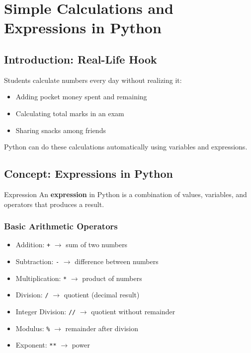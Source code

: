 \chapter{Simple Calculations and Expressions in Python}

\section{Introduction: Real-Life Hook}

Students calculate numbers every day without realizing it:  

\begin{itemize}
    \item Adding pocket money spent and remaining  
    \item Calculating total marks in an exam  
    \item Sharing snacks among friends  
\end{itemize}

Python can do these calculations automatically using variables and expressions.

\section{Concept: Expressions in Python}

\begin{definition}{Expression}
An \textbf{expression} in Python is a combination of values, variables, and operators that produces a result.
\end{definition}

\subsection{Basic Arithmetic Operators}

\begin{itemize}
    \item Addition: \texttt{+} $\rightarrow$ sum of two numbers  
    \item Subtraction: \texttt{-} $\rightarrow$ difference between numbers  
    \item Multiplication: \texttt{*} $\rightarrow$ product of numbers  
    \item Division: \texttt{/} $\rightarrow$ quotient (decimal result)  
    \item Integer Division: \texttt{//} $\rightarrow$ quotient without remainder  
    \item Modulus: \texttt{\%} $\rightarrow$ remainder after division  
    \item Exponent: \texttt{**} $\rightarrow$ power  
\end{itemize}

